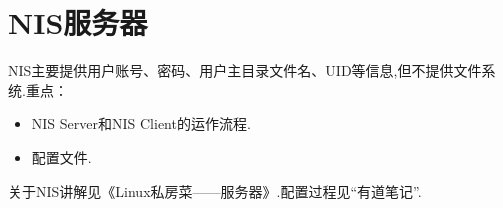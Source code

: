 \section{NIS服务器}
NIS主要提供用户账号、密码、用户主目录文件名、UID等信息,但不提供文件系统.重点：
\begin{itemize}
    \item NIS Server和NIS Client的运作流程.

    \item 配置文件.
\end{itemize}
\par
关于NIS讲解见《Linux私房菜——服务器》.配置过程见“有道笔记”.